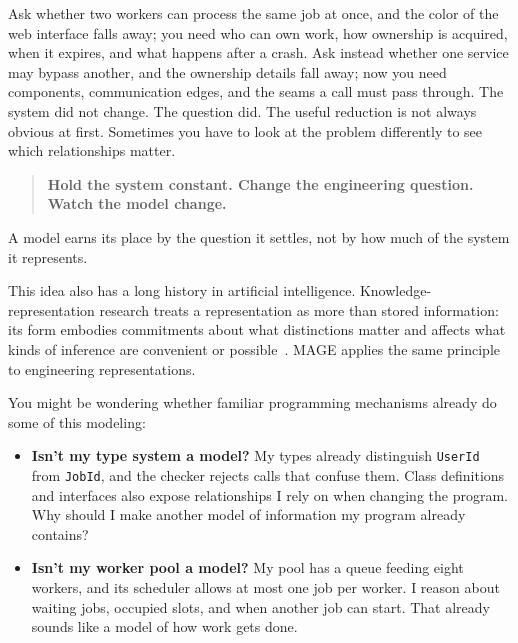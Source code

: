 Ask whether two workers can process the same job at once, and the color of the web interface falls away; you need who can own work, how ownership is acquired, when it expires, and what happens after a crash. Ask instead whether one service may bypass another, and the ownership details fall away; now you need components, communication edges, and the seams a call must pass through. The system did not change. The question did. The useful reduction is not always obvious at first. Sometimes you have to look at the problem differently to see which relationships matter.

\begin{quote}
\textbf{Hold the system constant. Change the engineering question. Watch the model change.}
\end{quote}


A model earns its place by the question it settles, not by how much of the system it represents.

This idea also has a long history in artificial intelligence. Knowledge-representation research treats a representation as more than stored information: its form embodies commitments about what distinctions matter and affects what kinds of inference are convenient or possible~\citep{davis1993kr}. MAGE applies the same principle to engineering representations.


You might be wondering whether familiar programming mechanisms already do some of this modeling:

\begin{itemize}
\tightlist
\item
  \textbf{Isn't my type system a model?} My types already distinguish \texttt{UserId} from \texttt{JobId}, and the checker rejects calls that confuse them. Class definitions and interfaces also expose relationships I rely on when changing the program. Why should I make another model of information my program already contains?
\item
  \textbf{Isn't my worker pool a model?} My pool has a queue feeding eight workers, and its scheduler allows at most one job per worker. I reason about waiting jobs, occupied slots, and when another job can start. That already sounds like a model of how work gets done.
\end{itemize}

